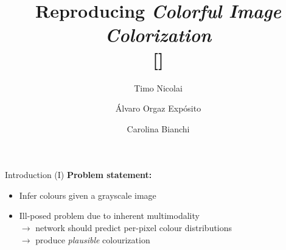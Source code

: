 \documentclass{beamer}
\title{Reproducing \textit{Colorful Image Colorization} \\ {[\cite{Zhang2016}]}}
\author{Timo Nicolai \and Álvaro Orgaz Expósito \and Carolina Bianchi}
\begin{document}
\begin{frame}
  \titlepage
\end{frame}


\begin{frame}{Introduction (I)}
  \textbf{Problem statement:}
    \begin{itemize}
      \item Infer colours given a grayscale image
      \item Ill-posed problem due to inherent multimodality \\
            $\rightarrow$ network should predict per-pixel colour distributions \\
            $\rightarrow$ produce \textit{plausible} colourization
    \end{itemize}

  \medskip


\end{frame}
\end{document}
